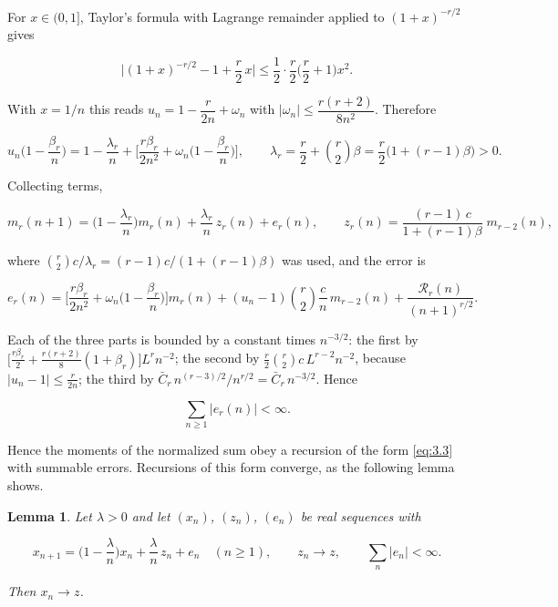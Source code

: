 \documentclass[aip,jmp,preprint,onecolumn,floatfix,superscriptaddress,nofootinbib,11pt]{revtex4-2}
\theoremstyle{plain}
\newtheorem{lemma}{Lemma}
\theoremstyle{remark}
\numberwithin{equation}{section}
\begin{document}
For $x\in(0,1]$, Taylor's formula with Lagrange remainder applied to $(1+x)^{-r/2}$ gives

\begin{equation*}
\Big|(1+x)^{-r/2}-1+\frac r2\,x\Big|\le\frac12\cdot\frac r2\Big(\frac r2+1\Big)x^{2}.
\end{equation*}

With $x=1/n$ this reads $u_n=1-\dfrac{r}{2n}+\omega_n$ with $|\omega_n|\le\dfrac{r(r+2)}{8n^{2}}$. Therefore

\begin{equation*}
u_n\Big(1-\frac{\beta_r}{n}\Big)=1-\frac{\lambda_r}{n}+\Big[\frac{r\beta_r}{2n^{2}}+\omega_n\Big(1-\frac{\beta_r}{n}\Big)\Big],\qquad \lambda_r=\frac r2+\binom r2\beta=\frac r2\big(1+(r-1)\beta\big)>0 .
\end{equation*}

Collecting terms,

\begin{equation}
m_r(n+1)=\Big(1-\frac{\lambda_r}{n}\Big)m_r(n)+\frac{\lambda_r}{n}\,z_r(n)+e_r(n),\qquad z_r(n)=\frac{(r-1)\,c}{1+(r-1)\beta}\;m_{r-2}(n),
\label{eq:3.3}
\end{equation}

where $\binom r2c/\lambda_r=(r-1)c/(1+(r-1)\beta)$ was used, and the error is

\begin{equation*}
e_r(n)=\Big[\frac{r\beta_r}{2n^{2}}+\omega_n\Big(1-\frac{\beta_r}{n}\Big)\Big]m_r(n)+(u_n-1)\binom r2\frac cn\,m_{r-2}(n)+\frac{\mathcal R_r(n)}{(n+1)^{r/2}} .
\end{equation*}

Each of the three parts is bounded by a constant times $n^{-3/2}$: the first by $\big[\tfrac{r\beta_r}{2}+\tfrac{r(r+2)}{8}(1+\beta_r)\big]L^{r}n^{-2}$; the second by $\tfrac r2\binom r2c\,L^{r-2}n^{-2}$, because $|u_n-1|\le\tfrac{r}{2n}$; the third by $\bar C_r\,n^{(r-3)/2}/n^{r/2}=\bar C_r\,n^{-3/2}$. Hence

\begin{equation}
\sum_{n\ge1}|e_r(n)|<\infty .
\label{eq:3.4}
\end{equation}

Hence the moments of the normalized sum obey a recursion of the form \eqref{eq:3.3} with summable errors. Recursions of this form converge, as the following lemma shows.

\begin{lemma}

Let $\lambda>0$ and let $(x_n)$, $(z_n)$, $(e_n)$ be real sequences with

\begin{equation*}
x_{n+1}=\Big(1-\frac\lambda n\Big)x_n+\frac\lambda n\,z_n+e_n\quad(n\ge1),\qquad z_n\to z,\qquad \sum_n|e_n|<\infty .
\end{equation*}

Then $x_n\to z$.

\end{lemma}
\end{document}
